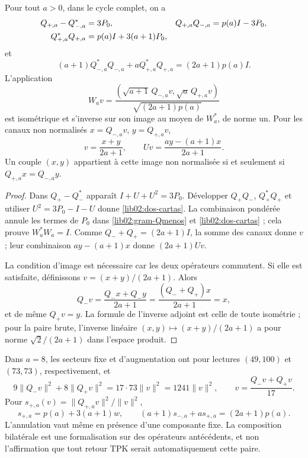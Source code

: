 \begin{theorem}
\label{lib02:balance-bilateral}
Pour tout \(a>0\), dans le cycle complet, on a
\begin{align}
 Q_{+,a}-Q_{-,a}^*&=3P_0,&
 Q_{+,a}Q_{-,a}&=p(a)I-3P_0,\notag\\
 Q_{+,a}^*Q_{+,a}&=p(a)I+3(a+1)P_0,
 \label{lib02:dos-cartas}
\end{align}
et
\begin{equation}
 (a+1)Q_{-,a}^*Q_{-,a}
 +aQ_{+,a}^*Q_{+,a}=(2a+1)p(a)I.
 \label{lib02:balance-pesado}
\end{equation}
L'application
\begin{equation}
 W_av=\frac{(\sqrt{a+1}\,Q_{-,a}v,
                    \sqrt a\,Q_{+,a}v)}{\sqrt{(2a+1)p(a)}}
 \label{lib02:W}
\end{equation}
est isométrique et s'inverse sur son image au moyen de \(W_a^*\), de norme un. Pour les canaux non normalisés \(x=Q_{-,a}v\), \(y=Q_{+,a}v\),
\begin{equation}
 v=\frac{x+y}{2a+1},\qquad
 Uv=\frac{ay-(a+1)x}{2a+1}.
 \label{lib02:reconstruccion-bilateral}
\end{equation}
Un couple \((x,y)\) appartient à cette image non normalisée si et seulement si
\(Q_{+,a}x=Q_{-,a}y\).
\end{theorem}
\begin{proof}
Dans \(Q_+-Q_-^*\) apparaît \(I+U+U^2=3P_0\). Développer
\(Q_+Q_-\), \(Q_+^*Q_+\) et utiliser
\(U^2=3P_0-I-U\) donne \eqref{lib02:dos-cartas}. La combinaison
pondérée annule les termes de \(P_0\) dans
\eqref{lib02:gram-Qmenos} et \eqref{lib02:dos-cartas} ; cela prouve
\(W_a^*W_a=I\). Comme \(Q_-+Q_+=(2a+1)I\), la somme des
canaux donne \(v\) ; leur combinaison \(ay-(a+1)x\) donne
\((2a+1)Uv\).

La condition d’image est nécessaire car les deux opérateurs commutent.
Si elle est satisfaite, définissons \(v=(x+y)/(2a+1)\). Alors
\[
 Q_-v=\frac{Q_-x+Q_-y}{2a+1}
 =\frac{(Q_-+Q_+)x}{2a+1}=x,
\]
et de même \(Q_+v=y\). La formule de l'inverse adjoint est celle de toute isométrie ; pour la paire brute, l'inverse linéaire \((x,y)\mapsto(x+y)/(2a+1)\) a pour norme \(\sqrt2/(2a+1)\) dans l'espace produit.
\end{proof}

Dans \(a=8\), les secteurs fixe et d’augmentation ont pour lectures
\((49,100)\) et \((73,73)\), respectivement, et
\[
 9\|Q_-v\|^2+8\|Q_+v\|^2=17\cdot73\|v\|^2=1241\|v\|^2,
 \qquad v=\frac{Q_-v+Q_+v}{17}.
\]
Pour \(s_{+,a}(v)=\|Q_{+,a}v\|^2/\|v\|^2\),
\[
 s_{+,a}=p(a)+3(a+1)w,
 \qquad (a+1)s_{-,a}+a s_{+,a}=(2a+1)p(a).
\]
L’annulation vaut même en présence d’une composante fixe. La composition bilatérale est
une formalisation sur des opérateurs antécédents, et non l’affirmation que
tout retour TPK serait automatiquement cette paire.

